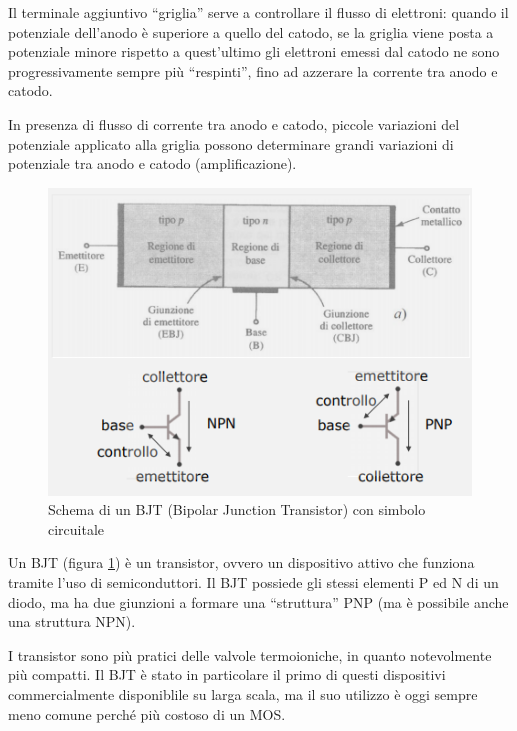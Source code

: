 \documentclass{article}
\begin{document}
\vspace{3mm}

Il terminale aggiuntivo ``griglia'' serve a controllare il flusso di elettroni: quando il potenziale dell’anodo è superiore a quello del catodo, se la griglia viene posta a potenziale minore rispetto a quest'ultimo gli elettroni emessi dal catodo ne sono progressivamente sempre più ``respinti'', fino ad azzerare la corrente tra anodo e catodo. 

\vspace{3mm}

In presenza di flusso di corrente tra anodo e catodo, piccole variazioni del potenziale applicato alla griglia possono determinare grandi variazioni di potenziale tra anodo e catodo (amplificazione).

\begin{figure}[h]
  \centering
  \includegraphics[scale=0.7]{IM_BJT}
  \caption{Schema di un BJT (Bipolar Junction Transistor) con simbolo circuitale}
  \label{Schema_BJT}
\end{figure}

Un BJT (figura \ref{Schema_BJT}) è un transistor, ovvero un dispositivo attivo che funziona tramite l'uso di semiconduttori. Il BJT possiede gli stessi elementi P ed N di un diodo, ma ha due giunzioni a formare una ``struttura'' PNP (ma è possibile anche una struttura NPN).

\vspace{3mm}

I transistor sono più pratici delle valvole termoioniche, in quanto notevolmente più compatti. Il BJT è stato in particolare il primo di questi dispositivi commercialmente disponiblile su larga scala, ma il suo utilizzo è oggi sempre meno comune perché più costoso di un MOS.
 
\end{document}
